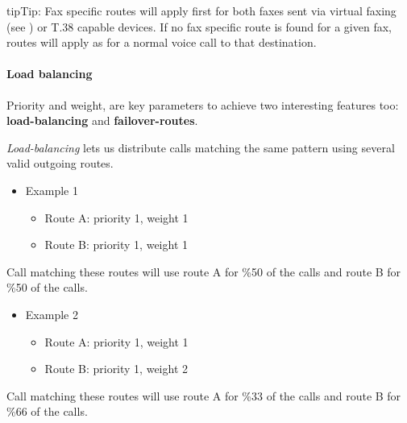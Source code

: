 \documentclass[letterpaper,10pt,english]{sphinxmanual}
\begin{document}
\begin{notice}{tip}{Tip:}
Fax specific routes will apply first for both faxes sent via virtual faxing (see {\hyperref[administration_portal/client/vpbx/faxes:faxes]{}}) or T.38 capable devices.
If no fax specific route is found for a given fax, routes will apply as for a normal voice call to that destination.
\end{notice}


\paragraph{Load balancing}
\label{administration_portal/brand/routing/outgoing_routings:load-balancing}
Priority and weight, are key parameters to achieve two interesting features too: \textbf{load-balancing} and \textbf{failover-routes}.

\emph{Load-balancing} lets us distribute calls matching the same pattern using
several valid outgoing routes.
\begin{itemize}
\item {} 
Example 1
\begin{itemize}
\item {} 
Route A: priority 1, weight 1

\item {} 
Route B: priority 1, weight 1

\end{itemize}

\end{itemize}

Call matching these routes will use route A for \%50 of the calls and route B for
\%50 of the calls.
\begin{itemize}
\item {} 
Example 2
\begin{itemize}
\item {} 
Route A: priority 1, weight 1

\item {} 
Route B: priority 1, weight 2

\end{itemize}

\end{itemize}

Call matching these routes will use route A for \%33 of the calls and route B for
\%66 of the calls.
\end{document}

